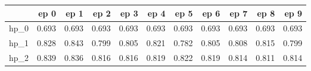 \begin{tabular}{lrrrrrrrrrr}
\toprule
{} &   ep 0 &   ep 1 &   ep 2 &   ep 3 &   ep 4 &   ep 5 &   ep 6 &   ep 7 &   ep 8 &   ep 9 \\
\midrule
hp\_0 &  0.693 &  0.693 &  0.693 &  0.693 &  0.693 &  0.693 &  0.693 &  0.693 &  0.693 &  0.693 \\
hp\_1 &  0.828 &  0.843 &  0.799 &  0.805 &  0.821 &  0.782 &  0.805 &  0.808 &  0.815 &  0.799 \\
hp\_2 &  0.839 &  0.836 &  0.816 &  0.816 &  0.819 &  0.822 &  0.819 &  0.814 &  0.811 &  0.814 \\
\bottomrule
\end{tabular}

